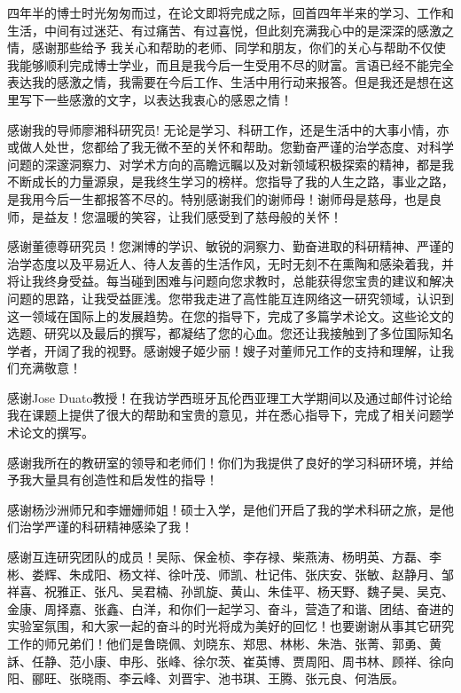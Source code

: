 

\begin{ack}

四年半的博士时光匆匆而过，在论文即将完成之际，回首四年半来的学习、工作和生活，中间有过迷茫、有过痛苦、有过喜悦，但此刻充满我心中的是深深的感激之情，感谢那些给予
我关心和帮助的老师、同学和朋友，你们的关心与帮助不仅使我能够顺利完成博士学业，而且是我今后一生受用不尽的财富。言语已经不能完全表达我的感激之情，我需要在今后工作、生活中用行动来报答。但是我还是想在这里写下一些感激的文字，以表达我衷心的感恩之情！

感谢我的导师廖湘科研究员! 无论是学习、科研工作，还是生活中的大事小情，亦或做人处世，您都给了我无微不至的关怀和帮助。您勤奋严谨的治学态度、对科学问题的深邃洞察力、对学术方向的高瞻远瞩以及对新领域积极探索的精神，都是我不断成长的力量源泉，是我终生学习的榜样。您指导了我的人生之路，事业之路，是我用今后一生都报答不尽的。特别感谢我们的谢师母！谢师母是慈母，也是良师，是益友！您温暖的笑容，让我们感受到了慈母般的关怀！

感谢董德尊研究员！您渊博的学识、敏锐的洞察力、勤奋进取的科研精神、严谨的治学态度以及平易近人、待人友善的生活作风，无时无刻不在熏陶和感染着我，并将让我终身受益。每当碰到困难与问题向您求教时，总能获得您宝贵的建议和解决问题的思路，让我受益匪浅。您带我走进了高性能互连网络这一研究领域，认识到这一领域在国际上的发展趋势。在您的指导下，完成了多篇学术论文。这些论文的选题、研究以及最后的撰写，都凝结了您的心血。您还让我接触到了多位国际知名学者，开阔了我的视野。感谢嫂子姬少丽！嫂子对董师兄工作的支持和理解，让我们充满敬意！

感谢Jose Duato教授！在我访学西班牙瓦伦西亚理工大学期间以及通过邮件讨论给我在课题上提供了很大的帮助和宝贵的意见，并在悉心指导下，完成了相关问题学术论文的撰写。

感谢我所在的教研室的领导和老师们！你们为我提供了良好的学习科研环境，并给予我大量具有创造性和启发性的指导！

感谢杨沙洲师兄和李姗姗师姐！硕士入学，是他们开启了我的学术科研之旅，是他们治学严谨的科研精神感染了我！

感谢互连研究团队的成员！吴际、保金桢、李存禄、柴燕涛、杨明英、方磊、李彬、娄辉、朱成阳、杨文祥、徐叶茂、师凯、杜记伟、张庆安、张敏、赵静月、邹祥喜、祝雅正、张凡、吴君楠、孙凯旋、黄山、朱佳平、杨天野、魏子昊、吴克、金康、周择嘉、张鑫、白洋，和你们一起学习、奋斗，营造了和谐、团结、奋进的实验室氛围，和大家一起的奋斗的时光将成为美好的回忆！也要谢谢从事其它研究工作的师兄弟们！他们是鲁晓佩、刘晓东、郑思、林彬、朱浩、张菁、郭勇、黄訸、任静、范小康、申彤、张峰、徐尔茨、崔英博、贾周阳、周书林、顾祥、徐向阳、郦旺、张晓雨、李云峰、刘晋宇、池书琪、王腾、张元良、何浩辰。


\end{ack}
